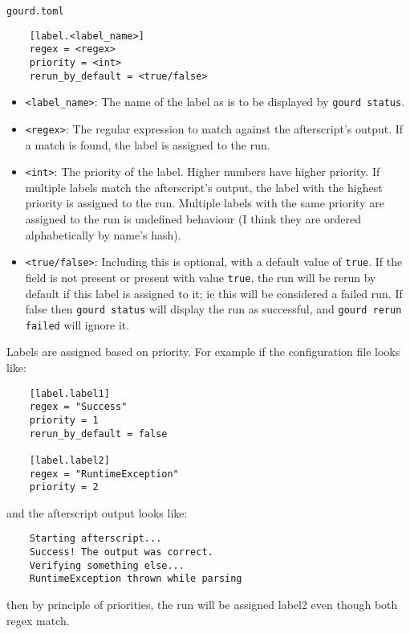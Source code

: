 \texttt{gourd.toml}
\begin{verbatim}
    [label.<label_name>]
    regex = <regex>
    priority = <int>
    rerun_by_default = <true/false>
\end{verbatim}
\begin{itemize}
    \item \verb|<label_name>|: The name of the label as is to be displayed by \verb|gourd status|.
    \item \verb|<regex>|: The regular expression to match against the afterscript's output.
    If a match is found, the label is assigned to the run.
    \item \verb|<int>|: The priority of the label.
    Higher numbers have higher priority.
    If multiple labels match the afterscript's output, the label with the highest priority is assigned to the run.
    Multiple labels with the same priority are assigned to the run is undefined behaviour (I think they are ordered alphabetically by name's hash).
    \item \verb|<true/false>|: Including this is optional, with a default value of \verb|true|.
    If the field is not present or present with value \verb|true|, the run will be rerun by default if this label is assigned to it; ie this will be considered a failed run.
    If false then \verb|gourd status| will display the run as successful, and \verb|gourd rerun failed| will ignore it.
\end{itemize}
Labels are assigned based on priority.
For example if the configuration file looks like:
\begin{verbatim}
    [label.label1]
    regex = "Success"
    priority = 1
    rerun_by_default = false

    [label.label2]
    regex = "RuntimeException"
    priority = 2
\end{verbatim}
and the afterscript output looks like:
\begin{verbatim}
    Starting afterscript...
    Success! The output was correct.
    Verifying something else...
    RuntimeException thrown while parsing
\end{verbatim}
then by principle of priorities, the run will be assigned label2 even though both regex match.